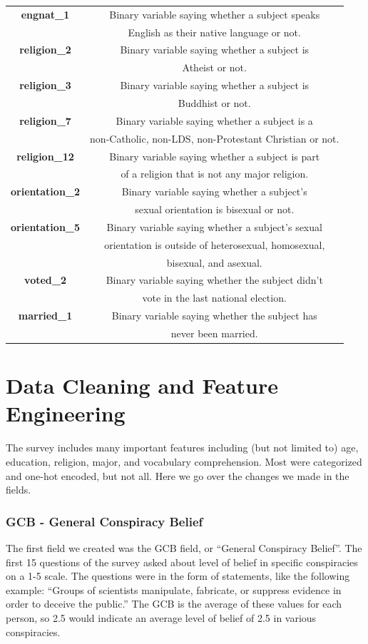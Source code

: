 \documentclass{article}[11pt]
\begin{document}
\begin{tabular}{ c|c }
        \hline
        \textbf{engnat\_1} & Binary variable saying whether a subject speaks \\ & English as their native language or not. \\
        \hline
        \textbf{religion\_2} & Binary variable saying whether a subject is \\ & Atheist or not. \\
        \hline
        \textbf{religion\_3} & Binary variable saying whether a subject is \\ & Buddhist or not. \\
        \hline
        \textbf{religion\_7} & Binary variable saying whether a subject is a \\ & non-Catholic, non-LDS, non-Protestant Christian or not. \\
        \hline
        \textbf{religion\_12} & Binary variable saying whether a subject is part \\ & of a religion that is not any major religion. \\
        \hline
        \textbf{orientation\_2} & Binary variable saying whether a subject's \\ & sexual orientation is bisexual or not. \\
        \hline
        \textbf{orientation\_5} & Binary variable saying whether a subject's sexual \\ & orientation is outside of heterosexual, homosexual, \\ & bisexual, and asexual. \\
        \hline
        \textbf{voted\_2} & Binary variable saying whether the subject didn't \\ & vote in the last national election. \\
        \hline
        \textbf{married\_1} & Binary variable saying whether the subject has \\ & never been married. \\
    \end{tabular}
\section*{Data Cleaning and Feature Engineering} The
survey includes many important features including (but not limited to)
age, education, religion, major, and vocabulary comprehension. Most were
categorized and one-hot encoded, but not all. Here we go over the
changes we made in the fields. 
\subsubsection*{GCB - General Conspiracy Belief}
The first field we created was the GCB field, or ``General Conspiracy
Belief''. The first 15 questions of the survey asked about level of
belief in specific conspiracies on a 1-5 scale. The questions were in
the form of statements, like the following example: ``Groups of
scientists manipulate, fabricate, or suppress evidence in order to
deceive the public.'' The GCB is the average of these values for each
person, so 2.5 would indicate an average level of belief of 2.5 in
various conspiracies.
\end{document}
